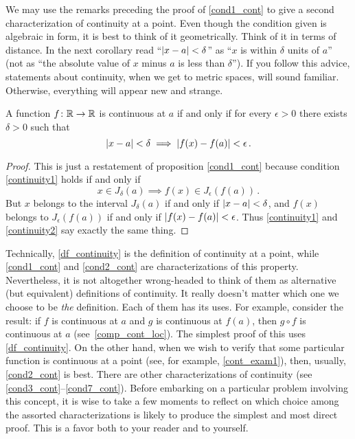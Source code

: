 We may use the remarks preceding the proof of \ref{cond1_cont} to give a second
characterization of continuity at a point.  Even though the condition given is algebraic in
form, it is best to think of it geometrically.  Think of it in terms of distance.  In the next
corollary read ``$\lvert x-a\rvert<\delta$'' as ``$x$ is within $\delta$ units of $a$'' (not as ``the
absolute value of $x$ minus $a$ is less than $\delta$'').  If you follow this advice,
statements about continuity, when we get to metric spaces, will sound familiar.  Otherwise,
everything will appear new and strange.


\begin{cor}\label{cond2_cont} A function $f\colon\mathbb{R} \rightarrow \mathbb{R}$ is continuous at $a$ if and
only if for every $\epsilon > 0$ there exists $\delta > 0$ such that
 \begin{equation}\label{continuity2}
   \lvert x - a\rvert < \delta  \implies \lvert f(x) - f(a)\rvert < \epsilon\,.
 \end{equation}
\end{cor}

\begin{proof} This is just a restatement of proposition \ref{cond1_cont} because condition
\eqref{continuity1} holds if and only if
 \[ x \in J_\delta(a) \implies  f(x) \in J_\epsilon(f(a))\,. \]
But $x$ belongs to the interval $J_\delta(a)$ if and only if $\lvert x - a\rvert < \delta$, and
$f(x)$ belongs to $J_\epsilon(f(a))$ if and only if $\lvert f(x) - f(a)\rvert < \epsilon$. Thus
\eqref{continuity1} and \eqref{continuity2} say exactly the same thing.
\end{proof}

Technically, \ref{df_continuity} is the definition of continuity at a point, while
\ref{cond1_cont} and \ref{cond2_cont} are characterizations of this property.
Nevertheless, it is not altogether wrong-headed to think of them as alternative (but
equivalent) definitions of continuity.  It really doesn't matter which one we choose to
be \emph{the} definition. Each of them has its uses.  For example, consider the result:
if $f$ is continuous at $a$ and $g$ is continuous at $f(a)$, then $g \circ f$ is
continuous at $a$ (see~\ref{comp_cont_loc}). The simplest proof of this uses
\ref{df_continuity}.  On the other hand, when we wish to verify that some particular
function is continuous at a point (see, for example, \ref{cont_exam1}), then, usually,
\ref{cond2_cont} is best.  There are other characterizations of continuity (see
\ref{cond3_cont}--\ref{cond7_cont}).  Before embarking on a particular problem involving
this concept, it is wise to take a few moments to reflect on which choice among the
assorted characterizations is likely to produce the simplest and most direct proof. This
is a favor both to your reader and to yourself.












